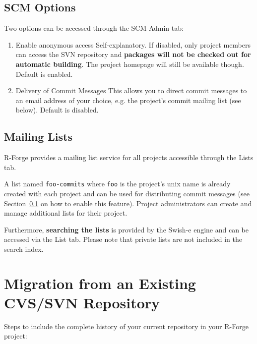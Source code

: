\documentclass[a4paper]{article}
\newcommand{\proglang}[1]{\textsf{#1}}
\begin{document}
\subsection{SCM Options}
\label{sec:scmoptions}
Two options can be accessed through the SCM Admin tab:
\begin{enumerate}
\item{Enable anonymous access} Self-explanatory. If disabled, only
  project members can access the SVN repository and  \textbf{packages
    will not be checked out for automatic building}. The project
  homepage will still be available though. Default is enabled.

\item{Delivery of Commit Messages} This allows you to direct commit
  messages to an email address of your choice, e.g. the project's
  commit mailing list (see below). Default is disabled.
\end{enumerate}


\subsection{Mailing Lists}
\proglang{R}-Forge provides a mailing list service for all projects accessible
through the Lists tab.  

A list named \texttt{foo-commits} where \texttt{foo} is the
project's unix name is already created with each project and can be
used for distributing commit messages (see
Section~\ref{sec:scmoptions}  on how to enable
this feature). Project administrators can create and manage additional
lists for their project.  

Furthermore, \textbf{searching the lists} is provided by the Swish-e engine
and can be accessed via the List tab. Please note that private lists
are not included in the search index.  


\section{Migration from an Existing CVS/SVN Repository}
\label{sec:svnmigration}

Steps to include the complete history of your current repository in
your \proglang{R}-Forge project:
\end{document}
